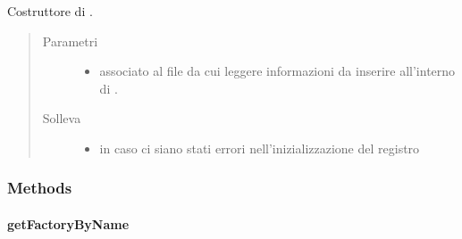 \documentclass[letterpaper,10pt,italian,openany,oneside]{sphinxmanual}
\begin{document}
\begin{fulllineitems}
\label{\detokenize{test/it/unicam/cs/pa/mastermind/factories/PlayerFactoryRegistry:it.unicam.cs.pa.mastermind.factories.PlayerFactoryRegistry.PlayerFactoryRegistry(String)}}
Costruttore di .
\begin{quote}\begin{description}
\item[{Parametri}] \leavevmode\begin{itemize}
\item {} 
 \textendash{} associato al file da cui leggere informazioni da inserire all’interno di .

\end{itemize}

\item[{Solleva}] \leavevmode\begin{itemize}
\item {} 
 \textendash{} in caso ci siano stati errori nell’inizializzazione del registro

\end{itemize}

\end{description}\end{quote}

\end{fulllineitems}



\subsubsection{Methods}
\label{\detokenize{test/it/unicam/cs/pa/mastermind/factories/PlayerFactoryRegistry:methods}}

\paragraph{getFactoryByName}
\label{\detokenize{test/it/unicam/cs/pa/mastermind/factories/PlayerFactoryRegistry:getfactorybyname}}
\end{document}
